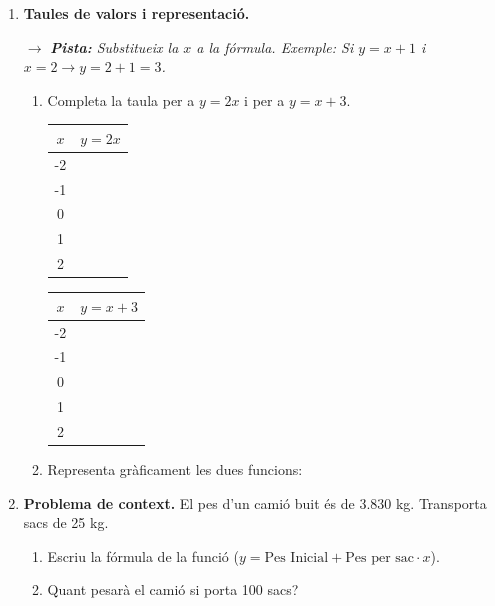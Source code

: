 \documentclass[12pt,a4paper]{article}
\newcommand{\pista}[1]{
    \par\vspace{2pt}
    {\small \color{blue!70!black} $\rightarrow$ \textit{\textbf{Pista:} #1}}
}
\begin{document}
\begin{enumerate}[resume]
    \item \textbf{Taules de valors i representació.}
    \pista{Substitueix la $x$ a la fórmula. Exemple: Si $y=x+1$ i $x=2 \to y=2+1=3$.}
    
    \begin{enumerate}
        \item Completa la taula per a $y = 2x$ i per a $y = x + 3$.
        
        \begin{center}
        \begin{tabular}{|c|c|}
            \hline
            $x$ & $y = 2x$ \\ \hline
            -2 &  \\ \hline
            -1 &  \\ \hline
            0 &  \\ \hline
            1 &  \\ \hline
            2 &  \\ \hline
        \end{tabular}
        \hspace{2cm}
        \begin{tabular}{|c|c|}
            \hline
            $x$ & $y = x + 3$ \\ \hline
            -2 &  \\ \hline
            -1 &  \\ \hline
            0 &  \\ \hline
            1 &  \\ \hline
            2 &  \\ \hline
        \end{tabular}
        \end{center}

        \item Representa gràficament les dues funcions:
        \begin{center}
        \end{center}
    \end{enumerate}

    \item \textbf{Problema de context.} El pes d'un camió buit és de 3.830 kg. Transporta sacs de 25 kg.
    \begin{enumerate}
        \item Escriu la fórmula de la funció ($y = \text{Pes Inicial} + \text{Pes per sac} \cdot x$).
        \item Quant pesarà el camió si porta 100 sacs?
    \end{enumerate}
\end{enumerate}
\end{document}
